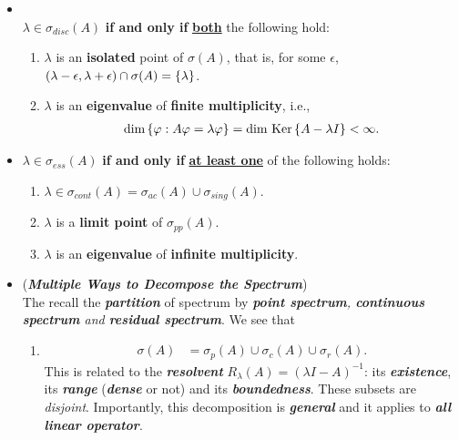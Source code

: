 \documentclass[11pt]{article}
\begin{document}
\begin{itemize}
\item \begin{proposition}  \citep{reed1980methods}\\
$\lambda \in \sigma_{disc}(A)$ \textbf{if and only if} \underline{\textbf{both}} the following hold: 
\begin{enumerate}
\item $\lambda$ is an \textbf{isolated} point of $\sigma(A)$, that is, for some $\epsilon$, $(\lambda -\epsilon, \lambda + \epsilon) \cap \sigma(A) = \left\{\lambda\right\}$. 
\item $\lambda$ is an \textbf{eigenvalue} of \textbf{finite multiplicity}, i.e., 
\begin{align*}
\text{dim}\left\{\varphi: A\varphi = \lambda \varphi\right\} =\text{dim }\text{Ker}\left\{A - \lambda I\right\} < \infty.
\end{align*} 
\end{enumerate}
\end{proposition}

\item \begin{proposition}
$\lambda \in \sigma_{ess}(A)$ \textbf{if and only if} \underline{\textbf{at least one}} of the following holds: 
\begin{enumerate}
\item $\lambda \in \sigma_{cont}(A) = \sigma_{ac}(A)  \cup \sigma_{sing}(A)$. 
\item $\lambda$ is a \textbf{limit point} of $\sigma_{pp}(A)$.
\item $\lambda$ is an \textbf{eigenvalue} of \textbf{infinite multiplicity}. 
\end{enumerate}
\end{proposition}

\item \begin{remark} (\emph{\textbf{Multiple Ways to Decompose the Spectrum}})\\
The recall the \emph{\textbf{partition}} of spectrum by \emph{\textbf{point spectrum}, \textbf{continuous spectrum} and \textbf{residual spectrum}}. We see that 
\begin{enumerate}
\item \begin{align*}
\sigma(A)&= \sigma_{p}(A) \cup \sigma_{c}(A) \cup \sigma_{r}(A).
\end{align*} This is related to the \emph{\textbf{resolvent}}  $R_{\lambda}(A) = (\lambda I - A)^{-1}$: its \emph{\textbf{existence}}, its \emph{\textbf{range}} (\emph{\textbf{dense}} or not) and its \emph{\textbf{boundedness}}. These subsets are \emph{disjoint}. Importantly, this decomposition is \emph{\textbf{general}} and it applies to \emph{\textbf{all  linear operator}}.


\end{enumerate}
\end{remark}
\end{itemize}
\end{document}
